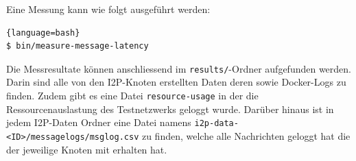 Eine Messung kann wie folgt ausgeführt werden:

\begin{lstlisting}[numbers=none]{language=bash}
$ bin/measure-message-latency
\end{lstlisting}

Die Messresultate können anschliessend im \lstinline|results/|-Ordner aufgefunden werden. Darin sind alle von den I2P-Knoten erstellten Daten deren sowie Docker-Logs zu finden. Zudem gibt es eine Datei \lstinline|resource-usage| in der die Ressourcenauslastung des Testnetzwerks geloggt wurde. Darüber hinaus ist in jedem I2P-Daten Ordner eine Datei namens \lstinline|i2p-data-<ID>/messagelogs/msglog.csv| zu finden, welche alle Nachrichten geloggt hat die der jeweilige Knoten mit erhalten hat.
